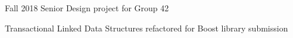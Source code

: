 Fall 2018 Senior Design project for Group 42

Transactional Linked Data Structures refactored for Boost library submission 